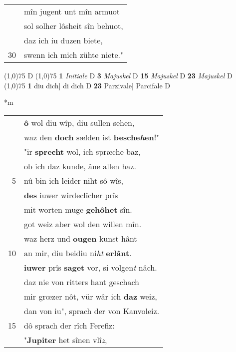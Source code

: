 \documentclass[8pt,a4paper,notitlepage]{article}
\begin{document}
\begin{table}[ht]
\begin{minipage}[t]{0.5\linewidth}
\begin{tabular}{rl}
 & mîn jugent unt mîn armuot\\ 
 & sol solher lôsheit sîn behuot,\\ 
 & daz ich iu duzen biete,\\ 
30 & swenn ich mich zühte niete."\\ 
\end{tabular}
\scriptsize
\line(1,0){75} \newline
D \newline
\line(1,0){75} \newline
\textbf{1} \textit{Initiale} D  \textbf{3} \textit{Majuskel} D  \textbf{15} \textit{Majuskel} D  \textbf{23} \textit{Majuskel} D  \newline
\line(1,0){75} \newline
\textbf{1} diu dich] di dich D \textbf{23} Parzivale] Parcifale D \newline
\end{minipage}
\hspace{0.5cm}
\begin{minipage}[t]{0.5\linewidth}
\small
\begin{center}*m
\end{center}
\begin{tabular}{rl}
 & \textbf{ô} wol diu wîp, diu sullen sehen,\\ 
 & waz den \textbf{doch} sælden ist \textbf{besche\textit{h}en}!"\\ 
 & "ir \textbf{sprecht} wol, ich spræche baz,\\ 
 & ob ich daz kunde, âne allen haz.\\ 
5 & nû bin ich leider niht sô wîs,\\ 
 & \textbf{des} iuwer wirdeclîcher prîs\\ 
 & mit worten muge \textbf{gehôhet} sîn.\\ 
 & got weiz aber wol den willen mîn.\\ 
 & waz herz und \textbf{ougen} kunst hânt\\ 
10 & an mir, diu beidiu ni\textit{ht} \textbf{erlânt}.\\ 
 & \textbf{iuwer} prîs \textbf{saget} vor, si volgen\textit{t} nâch.\\ 
 & daz nie von ritters hant geschach\\ 
 & mir grœzer nôt, vür wâr ich \textbf{daz} weiz,\\ 
 & dan von iu", sprach der von Kanvoleiz.\\ 
15 & dô sprach der rîch Ferefiz:\\ 
 & "\textbf{Jupiter} het sînen vlî\textit{z},\\ 

\end{tabular}
\end{minipage}
\end{table}
\end{document}
